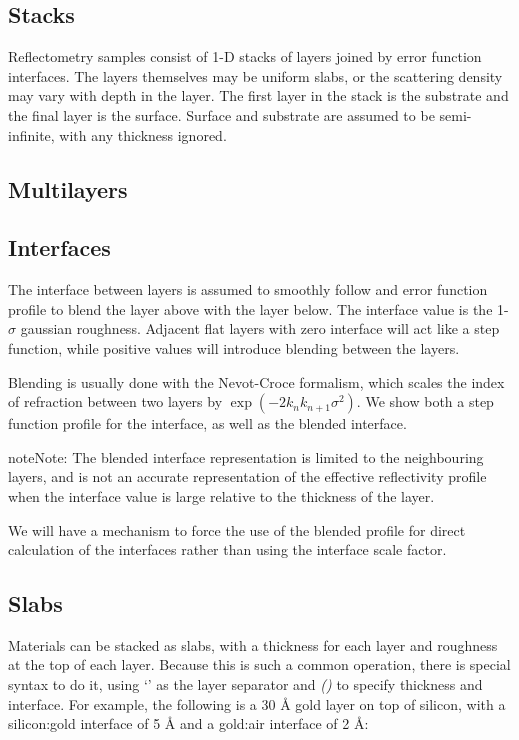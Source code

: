 \documentclass[letterpaper,10pt,english]{sphinxmanual}
\begin{document}
\subsection{Stacks}
\label{guide/sample:stacks}
Reflectometry samples consist of 1-D stacks of layers joined by error
function interfaces. The layers themselves may be uniform slabs, or
the scattering density may vary with depth in the layer.  The first
layer in the stack is the substrate and the final layer is the surface.
Surface and substrate are assumed to be semi-infinite, with any thickness
ignored.


\subsection{Multilayers}
\label{guide/sample:multilayers}

\subsection{Interfaces}
\label{guide/sample:interfaces}
The interface between layers is assumed to smoothly follow and
error function profile to blend the layer above with the layer below.
The interface value is the 1-$\sigma$ gaussian roughness.
Adjacent flat layers with zero interface will act like a step function,
while positive values will introduce blending between the layers.

Blending is usually done with the Nevot-Croce formalism, which scales
the index of refraction between two layers by $\exp(-2 k_n k_{n+1} \sigma^2)$.
We show both a step function profile for the interface, as well as the
blended interface.

\begin{notice}{note}{Note:}
The blended interface representation is limited to the neighbouring
layers, and is not an accurate representation of the effective
reflectivity profile when the interface value is large relative to
the thickness of the layer.
\end{notice}

We will have a mechanism to force the use of the blended profile for
direct calculation of the interfaces rather than using the interface
scale factor.


\subsection{Slabs}
\label{guide/sample:slabs}
Materials can be stacked as slabs, with a thickness for each layer and
roughness at the top of each layer.  Because this is such a common
operation, there is special syntax to do it, using `\textbar{}' as the layer
separator and \emph{()} to specify thickness and interface.  For example,
the following is a 30 Å gold layer on top of silicon, with a
silicon:gold interface of 5 Å and a gold:air interface of 2 Å:
\end{document}

